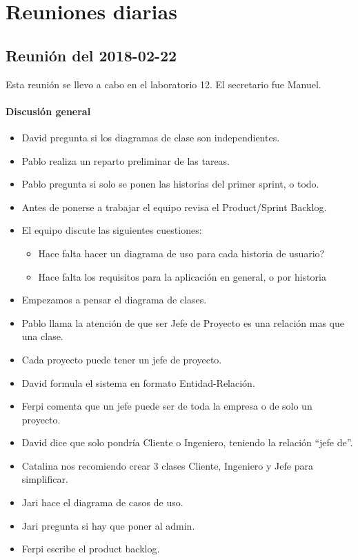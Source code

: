\documentclass[a4paper, 12pt, spanish]{memoria}
\begin{document}

\section*{Reuniones diarias}

\subsection*{Reunión del 2018-02-22}
Esta reunión se llevo a cabo en el laboratorio 12. El secretario fue Manuel.

\paragraph{Discusión general}
\begin{itemize}
\item David pregunta si los diagramas de clase son independientes.
\item Pablo realiza un reparto preliminar de las tareas.
\item Pablo pregunta si solo se ponen las historias del primer sprint, o todo.
\item Antes de ponerse a trabajar el equipo revisa el Product/Sprint Backlog.
\item El equipo discute las siguientes cuestiones:
  \begin{itemize}
  \item Hace falta hacer un diagrama de uso para cada historia de usuario?
  \item Hace falta los requisitos para la aplicación en general, o por historia
  \end{itemize}
\item Empezamos a pensar el diagrama de clases.
\item Pablo llama la atención de que ser Jefe de Proyecto es una relación mas que una clase.
\item Cada proyecto puede tener un jefe de proyecto.
\item David formula el sistema en formato Entidad-Relación.
\item Ferpi comenta que un jefe puede ser de toda la empresa o de solo un proyecto.
\item David dice que solo pondría Cliente o Ingeniero, teniendo la relación ``jefe de''.
\item Catalina nos recomiendo crear 3 clases Cliente, Ingeniero y Jefe para simplificar.
\item Jari hace el diagrama de casos de uso.
\item Jari pregunta si hay que poner al admin.
\item Ferpi escribe el product backlog.
\end{itemize}
\end{document}
